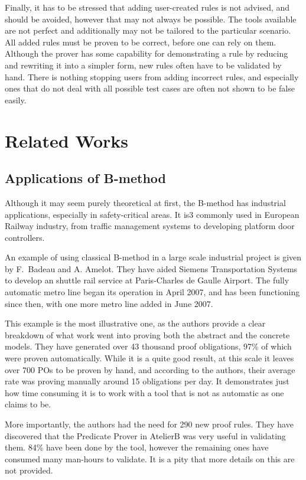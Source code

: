\documentclass[11pt,journal]{IEEEtran}
\begin{document}
	Finally, it has to be stressed that adding user-created rules is not advised, and should be avoided, however that may not always be possible. The tools available are not perfect and additionally may not be tailored to the particular scenario. All added rules must be proven to be correct, before one can rely on them. Although the prover has some capability for demonstrating a rule by reducing and rewriting it into a simpler form, new rules often have to be validated by hand. There is nothing stopping users from adding incorrect rules, and especially ones that do not deal with all possible test cases are often not shown to be false easily.
	
	\section{Related Works}
	
	\subsection{Applications of B-method}
	Although it may seem purely theoretical at first, the B-method has industrial applications, especially in safety-critical areas. It is3 commonly used in European Railway industry, from traffic management systems to developing platform door controllers\cite{Door controller}.
	
	An example of using classical B-method in a large scale industrial project is given by F.~Badeau and A. Amelot\cite{airport shuttle}. They have aided Siemens Transportation Systems to develop an shuttle rail service at Paris-Charles de Gaulle Airport. The fully automatic metro line began its operation in April 2007, and has been functioning since then, with one more metro line added in June 2007.
	
	This example is the most illustrative one, as the authors provide a clear breakdown of what work went into proving both the abstract and the concrete models. They have generated over 43 thousand proof obligations, 97\% of which were proven automatically. While it is a quite good result, at this scale it leaves over 700 POs to be proven by hand, and according to the authors, their average rate was proving manually around 15 obligations per day. It demonstrates just how time consuming it is to work with a tool that is not as automatic as one claims to be.
	
	More importantly, the authors had the need for 290 new proof rules. They have discovered that the Predicate Prover in AtelierB was very useful in validating them. 84\% have been done by the tool, however the remaining ones have consumed many man-hours to validate. It is a pity that more details on this are not provided.
	
\end{document}
